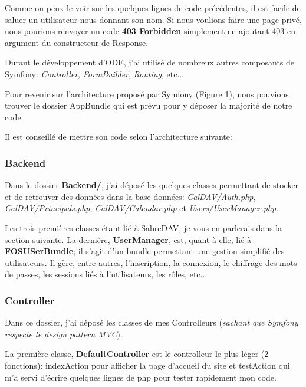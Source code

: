 Comme on peux le voir sur les quelques lignes de code précédentes, il est facile de saluer un utilisateur nous donnant son nom. Si nous voulions faire une page privé, nous pourions renvoyer un code \textbf{403 Forbidden} simplement en ajoutant 403 en argument du constructeur de Response.

Durant le développement d'ODE, j'ai utilisé de nombreux autres composants de Symfony: \textit{Controller}, \textit{FormBuilder}, \textit{Routing}, etc...

\vspace{1cm}

Pour revenir sur l'architecture proposé par Symfony (Figure 1), nous pouvions trouver le dossier AppBundle qui est prévu pour y déposer la majorité de notre code.


Il est conseillé de mettre son code selon l'architecture suivante:

\subsubsection*{Backend}

Dans le dossier \textbf{Backend/}, j'ai déposé les quelques classes permettant de stocker et de retrouver des données dans la base données: \textit{CalDAV/Auth.php}, \textit{CalDAV/Principals.php}, \textit{CalDAV/Calendar.php} et \textit{Users/UserManager.php}.

Les trois premières classes étant lié à SabreDAV, je vous en parlerais dans la section suivante. La dernière, \textbf{UserManager}, est, quant à elle, lié à \textbf{FOSUSerBundle}; il s'agit d'un bundle permettant une gestion simplifié des utilisateurs. Il gère, entre autres, l'inscription, la connexion, le chiffrage des mots de passes, les sessions liés à l'utilisateurs, les rôles, etc...

\subsubsection*{Controller}

Dans ce dossier, j'ai déposé les classes de mes Controlleurs (\textit{sachant que Symfony respecte le design pattern MVC}).

La première classe, \textbf{DefaultController} est le controlleur le plus léger (2 fonctions): indexAction pour afficher la page d'accueil du site et testAction qui m'a servi d'écrire quelques lignes de php pour tester rapidement mon code.


